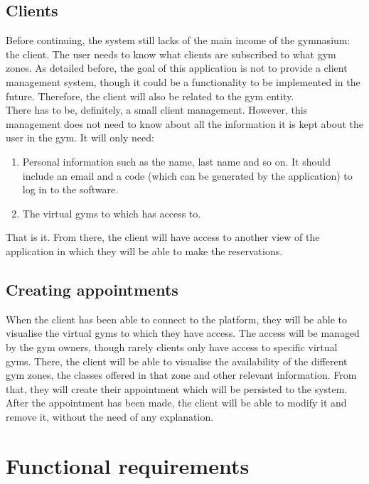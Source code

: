 \documentclass[a4paper, 12pt, oneside]{book}
\begin{document}
\subsection{Clients}
Before continuing, the system still lacks of the main income of the gymnasium: the client. The user needs to know what clients are subscribed to what gym zones. As detailed before, the goal of this application is not to provide a client management system, though it could be a functionality to be implemented in the future. Therefore, the client will also be related to the gym entity.
\\[8pt]
There has to be, definitely, a small client management. However, this management does not need to know about all the information it is kept about the user in the gym. It will only need:
\begin{enumerate}[label = -]
	\item Personal information such as the name, last name and so on. It should include an email and a code (which can be generated by the application) to log in to the software.
	\item The virtual gyms to which has access to.
\end{enumerate}
That is it. From there, the client will have access to another view of the application in which they will be able to make the reservations.
\subsection{Creating appointments}
When the client has been able to connect to the platform, they will be able to visualise the virtual gyms to which they have access. The access will be managed by the gym owners, though rarely clients only have access to specific virtual gyms. There, the client will be able to visualise the availability of the different gym zones, the classes offered in that zone and other relevant information. From that, they will create their appointment which will be persisted to the system.
\\[8pt]
After the appointment has been made, the client will be able to modify it and remove it, without the need of any explanation.
\section{Functional requirements}
\end{document}
